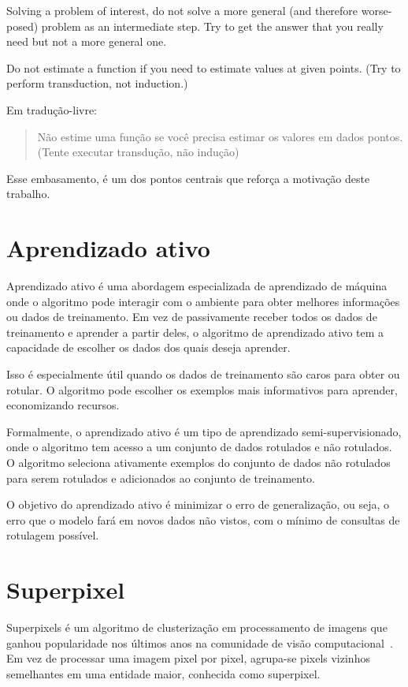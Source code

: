\begin{displayquote}

  Solving a problem of interest, do not solve a more general (and therefore worse-
  posed) problem as an intermediate step. Try to get the answer that you really need
  but not a more general one.

  Do not estimate a function if you need to estimate values at given
  points. (Try to perform transduction, not induction.)

\end{displayquote}

Em tradução-livre: \blockquote{Não estime uma função se você precisa estimar
os valores em dados pontos. (Tente executar transdução, não
indução)}. Esse embasamento, é um dos pontos centrais que reforça a motivação deste trabalho.


\section{Aprendizado ativo}\label{sec:teorica-aprendizado-ativo}

Aprendizado ativo é uma abordagem especializada de aprendizado de
máquina onde o algoritmo pode interagir com o ambiente para obter
melhores informações ou dados de treinamento. Em vez de passivamente
receber todos os dados de treinamento e aprender a partir deles, o
algoritmo de aprendizado ativo tem a capacidade de escolher os dados
dos quais deseja aprender.

Isso é especialmente útil quando os dados de treinamento são caros
para obter ou rotular. O algoritmo pode escolher os exemplos mais
informativos para aprender, economizando recursos.

Formalmente, o aprendizado ativo é um tipo de aprendizado
semi-supervisionado, onde o algoritmo tem acesso a um conjunto de
dados rotulados e não rotulados. O algoritmo seleciona ativamente
exemplos do conjunto de dados não rotulados para serem rotulados e
adicionados ao conjunto de treinamento.

O objetivo do aprendizado ativo é minimizar o erro de generalização,
ou seja, o erro que o modelo fará em novos dados não vistos, com o
mínimo de consultas de rotulagem possível.

\section{Superpixel}\label{sec:teorica-superpixel}

Superpixels é um algoritmo de clusterização em processamento de
imagens que ganhou popularidade nos últimos anos na comunidade de
visão computacional~\cite{SuperpixelSurvey2020}. Em vez de processar
uma imagem pixel por pixel, agrupa-se pixels vizinhos semelhantes em
uma entidade maior, conhecida como superpixel.

